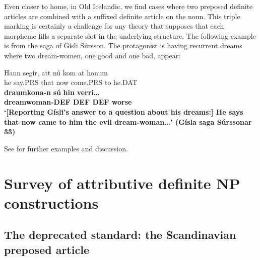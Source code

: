 \ea\label{}

\z 
\z 

Even closer to home, in Old Icelandic, we find cases where two preposed definite articles are combined with a suffixed definite article on the noun. This triple marking is certainly a challenge for any theory that supposes that each morpheme fills a separate slot in the underlying structure. The following example is from the saga of Gísli Súrsson. The protagonist is having recurrent dreams where two dream-women, one good and one bad, appear: 

\ea\label{}
\gll Hann  segir,  att  nú  kom  at  honum\\
he  say.PRS   that  now  come.PRS  to  he.DAT\\
\gll \textbf{draumkona}\textbf{{}-n}\textbf{  sú} \textbf{hin} \textbf{verri…}\\
\bfseries dreamwoman-DEF  DEF  DEF  worse\\
\glt ‘[Reporting Gísli’s answer to a question about his dreams:] He says that now came to him the evil dream-woman…’ (Gísla saga Súrssonar 33)
\z

 See \citet{Dahl2003} for further examples and discussion.


\section{Survey of attributive definite NP constructions}
\label{bkm:Ref224464037}\subsection{The deprecated standard: the Scandinavian preposed article}
\label{bkm:Ref154983973}\label{bkm:Ref154988501}

